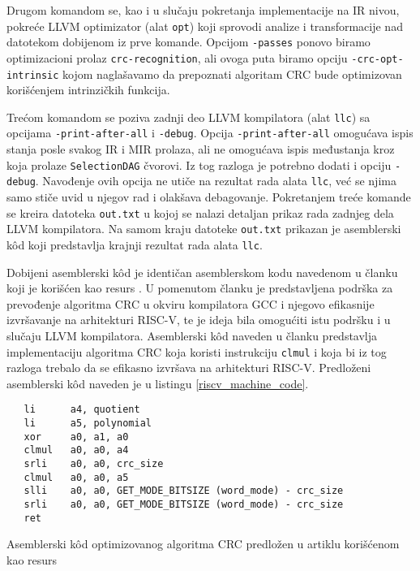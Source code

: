 \documentclass[12pt,oneside]{memoir}
\begin{document}
Drugom komandom se, kao i u slučaju pokretanja implementacije na IR nivou, pokreće LLVM optimizator (alat \texttt{opt}) koji sprovodi analize i transformacije nad datotekom dobijenom iz prve komande. Opcijom \texttt{-passes} ponovo biramo optimizacioni prolaz  \texttt{crc-recognition}, ali ovoga puta biramo opciju \texttt{-crc-opt-intrinsic} kojom naglašavamo da prepoznati algoritam CRC bude optimizovan korišćenjem intrinzičkih funkcija.

Trećom komandom se poziva zadnji deo LLVM kompilatora (alat \texttt{llc}) sa opcijama \texttt{-print-after-all} i \texttt{-debug}. Opcija \texttt{-print-after-all} omogućava ispis stanja posle svakog IR i MIR prolaza, ali ne omogućava ispis međustanja kroz koja prolaze \texttt{SelectionDAG} čvorovi. Iz tog razloga je potrebno dodati i opciju \texttt{-debug}. Navođenje ovih opcija ne utiče na rezultat rada alata \texttt{llc}, već se njima samo stiče uvid u njegov rad i olakšava debagovanje. Pokretanjem treće komande se kreira datoteka \texttt{out.txt} u kojoj se nalazi detaljan prikaz rada zadnjeg dela LLVM kompilatora. Na samom kraju datoteke \texttt{out.txt}  prikazan je asemblerski k\^od koji predstavlja krajnji rezultat rada alata \texttt{llc}. 

Dobijeni asemblerski k\^od je identičan asemblerskom kodu navedenom u članku koji je korišćen kao resurs \cite{patch_about_crc_support}. U pomenutom članku je predstavljena podrška za prevođenje algoritma CRC u okviru kompilatora GCC i njegovo efikasnije izvršavanje na arhitekturi RISC-V, te je ideja bila omogućiti istu podršku i u slučaju LLVM kompilatora. Asemblerski k\^od naveden u članku predstavlja implementaciju algoritma CRC koja koristi instrukciju \texttt{clmul} i koja bi iz tog razloga trebalo da se efikasno izvršava na arhitekturi RISC-V. Predloženi asemblerski k\^od naveden je u listingu \ref{riscv_machine_code}.

\begin{listing}[!ht]
\begin{verbatim}
   li      a4, quotient
   li      a5, polynomial
   xor     a0, a1, a0
   clmul   a0, a0, a4
   srli    a0, a0, crc_size
   clmul   a0, a0, a5
   slli    a0, a0, GET_MODE_BITSIZE (word_mode) - crc_size
   srli    a0, a0, GET_MODE_BITSIZE (word_mode) - crc_size
   ret
\end{verbatim}
\caption{Asemblerski k\^od optimizovanog algoritma CRC predložen u artiklu korišćenom kao resurs}
\label{riscv_machine_code}
\centering
\end{listing}
\end{document}
